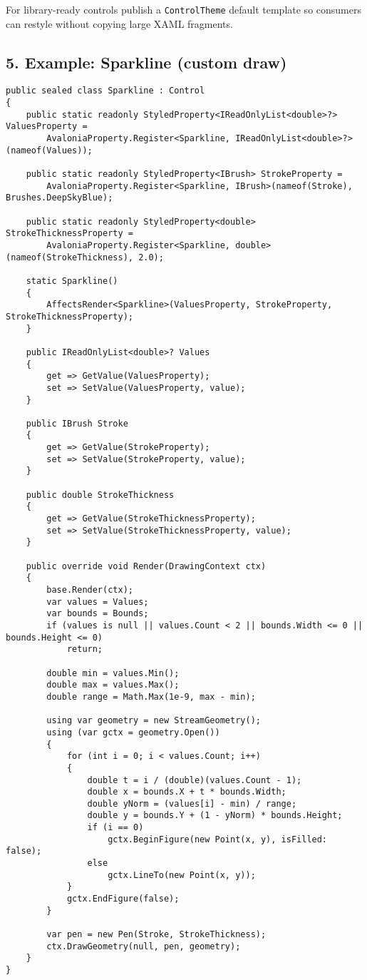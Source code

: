 For library-ready controls publish a
\passthrough{\lstinline!ControlTheme!} default template so consumers can
restyle without copying large XAML fragments.

\subsection{5. Example: Sparkline (custom
draw)}\label{example-sparkline-custom-draw}

\begin{lstlisting}
public sealed class Sparkline : Control
{
    public static readonly StyledProperty<IReadOnlyList<double>?> ValuesProperty =
        AvaloniaProperty.Register<Sparkline, IReadOnlyList<double>?>(nameof(Values));

    public static readonly StyledProperty<IBrush> StrokeProperty =
        AvaloniaProperty.Register<Sparkline, IBrush>(nameof(Stroke), Brushes.DeepSkyBlue);

    public static readonly StyledProperty<double> StrokeThicknessProperty =
        AvaloniaProperty.Register<Sparkline, double>(nameof(StrokeThickness), 2.0);

    static Sparkline()
    {
        AffectsRender<Sparkline>(ValuesProperty, StrokeProperty, StrokeThicknessProperty);
    }

    public IReadOnlyList<double>? Values
    {
        get => GetValue(ValuesProperty);
        set => SetValue(ValuesProperty, value);
    }

    public IBrush Stroke
    {
        get => GetValue(StrokeProperty);
        set => SetValue(StrokeProperty, value);
    }

    public double StrokeThickness
    {
        get => GetValue(StrokeThicknessProperty);
        set => SetValue(StrokeThicknessProperty, value);
    }

    public override void Render(DrawingContext ctx)
    {
        base.Render(ctx);
        var values = Values;
        var bounds = Bounds;
        if (values is null || values.Count < 2 || bounds.Width <= 0 || bounds.Height <= 0)
            return;

        double min = values.Min();
        double max = values.Max();
        double range = Math.Max(1e-9, max - min);

        using var geometry = new StreamGeometry();
        using (var gctx = geometry.Open())
        {
            for (int i = 0; i < values.Count; i++)
            {
                double t = i / (double)(values.Count - 1);
                double x = bounds.X + t * bounds.Width;
                double yNorm = (values[i] - min) / range;
                double y = bounds.Y + (1 - yNorm) * bounds.Height;
                if (i == 0)
                    gctx.BeginFigure(new Point(x, y), isFilled: false);
                else
                    gctx.LineTo(new Point(x, y));
            }
            gctx.EndFigure(false);
        }

        var pen = new Pen(Stroke, StrokeThickness);
        ctx.DrawGeometry(null, pen, geometry);
    }
}
\end{lstlisting}

